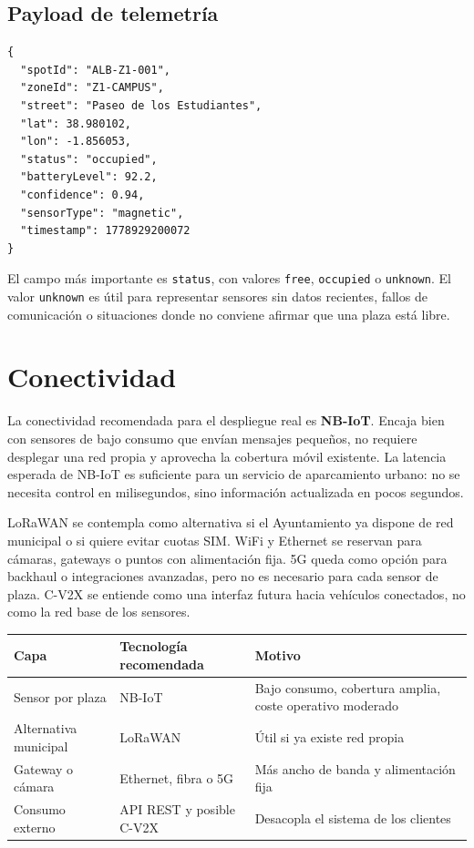 \documentclass[11pt,a4paper]{article}
\begin{document}
\subsection{Payload de telemetría}
\begin{lstlisting}
{
  "spotId": "ALB-Z1-001",
  "zoneId": "Z1-CAMPUS",
  "street": "Paseo de los Estudiantes",
  "lat": 38.980102,
  "lon": -1.856053,
  "status": "occupied",
  "batteryLevel": 92.2,
  "confidence": 0.94,
  "sensorType": "magnetic",
  "timestamp": 1778929200072
}
\end{lstlisting}

El campo más importante es \texttt{status}, con valores \texttt{free}, \texttt{occupied} o \texttt{unknown}. El valor \texttt{unknown} es útil para representar sensores sin datos recientes, fallos de comunicación o situaciones donde no conviene afirmar que una plaza está libre.

\section{Conectividad}

La conectividad recomendada para el despliegue real es \textbf{NB-IoT}. Encaja bien con sensores de bajo consumo que envían mensajes pequeños, no requiere desplegar una red propia y aprovecha la cobertura móvil existente. La latencia esperada de NB-IoT es suficiente para un servicio de aparcamiento urbano: no se necesita control en milisegundos, sino información actualizada en pocos segundos.

LoRaWAN se contempla como alternativa si el Ayuntamiento ya dispone de red municipal o si quiere evitar cuotas SIM. WiFi y Ethernet se reservan para cámaras, gateways o puntos con alimentación fija. 5G queda como opción para backhaul o integraciones avanzadas, pero no es necesario para cada sensor de plaza. C-V2X se entiende como una interfaz futura hacia vehículos conectados, no como la red base de los sensores.

\begin{longtable}{P{4.1cm}P{4.1cm}P{6.5cm}}
\toprule
\textbf{Capa} & \textbf{Tecnología recomendada} & \textbf{Motivo} \\
\midrule
\endhead
Sensor por plaza & NB-IoT & Bajo consumo, cobertura amplia, coste operativo moderado \\
Alternativa municipal & LoRaWAN & Útil si ya existe red propia \\
Gateway o cámara & Ethernet, fibra o 5G & Más ancho de banda y alimentación fija \\
Consumo externo & API REST y posible C-V2X & Desacopla el sistema de los clientes \\
\bottomrule
\end{longtable}
\end{document}
